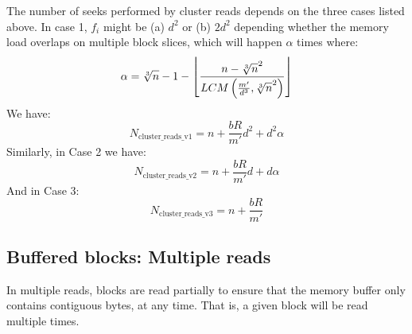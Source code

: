 \documentclass[10pt, conference, compsocconf]{IEEEtran}
\DeclarePairedDelimiter{\floor}{\lfloor}{\rfloor}
\newcommand{\todo}[1]{
  \color{red}\emph{[#1]}
  \color{black}
}
\begin{document}
The number of seeks performed by cluster reads depends on the three
cases listed above. In case 1, $f_i$ might be (a) $d^2$
 or (b) $2d^2$
depending whether the memory load
overlaps on multiple block slices, which will happen
$\alpha$
times where:
\begin{equation*}
  \alpha=\sqrt[3]{n}-1-\floor*{\frac{n-\sqrt[3]{n}^2}{LCM\left(\frac{m'}{d^3},\sqrt[3]{n}^2\right)}}
\end{equation*}
 We have:
\begin{equation}
  N_\mathrm{cluster\_reads\_v1}= n + \frac{bR}{m'}d^2+d^2\alpha
\end{equation}
Similarly, in Case 2 we have:
\begin{equation}
  N_\mathrm{cluster\_reads\_v2}= n + \frac{bR}{m'}d+d\alpha
\end{equation}
And in Case 3:
\begin{equation}
  N_\mathrm{cluster\_reads\_v3}= n + \frac{bR}{m'}
\end{equation}

    
\subsection{Buffered blocks: Multiple reads}

In multiple reads, blocks are read partially to ensure that the memory
buffer only contains contiguous bytes, at any time. That is, a given
block will be read multiple times.

\end{document}
